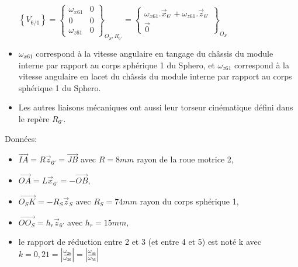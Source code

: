 \begin{itemize}
$\left \{V_{6/ 1}\right\}=\left\{
\begin{matrix}
 \omega_{x61} & 0 \\
 0 & 0 \\
 \omega_{z61} & 0 
\end{matrix}
\right\}_{O_S,R_{6'}}=\left \{\begin{matrix} \omega_{x61}.\vec{x}_{6'}+\omega_{z61}.\vec{z}_{6'} \\ 
 \vec{0}\end{matrix}\right \}_{O_S}$
 \item $\omega_{x61}$ correspond à la vitesse angulaire en tangage du châssis du module interne par rapport au corps sphérique 1 du Sphero, et $\omega_{z61}$ correspond à la vitesse angulaire en lacet du châssis du module interne par rapport au corps sphérique 1 du Sphero.
 \item Les autres liaisons mécaniques ont aussi leur torseur cinématique défini dans le repère $R_{6'}$.
\end{itemize}


Données:
\begin{itemize}
 \item $\vec{IA}=R\vec{z}_{6'}=\vec{JB}$ avec $R=8mm$ rayon de la roue motrice 2,
 \item $\vec{OA}=L\vec{x}_{6'}=-\vec{OB}$,
 \item $\vec{O_SK}=-R_S\vec{z}_S$ avec $R_S=74mm$ rayon du corps sphérique 1,
 \item $\vec{OO_S}=h_r\vec{z}_{6'}$ avec $h_r=15mm$,
 \item le rapport de réduction entre 2 et 3 (et entre 4 et 5) est noté k avec 
 $k=0,21=\left|\frac{\omega_{26}}{\omega_{36}}\right|=\left|\frac{\omega_{46}}{\omega_{56}}\right|$
\end{itemize}




